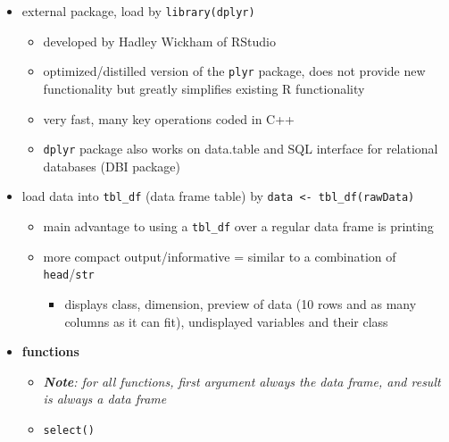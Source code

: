 \documentclass[
]{article}
\providecommand{\tightlist}{%
  \setlength{\itemsep}{0pt}\setlength{\parskip}{0pt}}
\begin{document}
\begin{itemize}
\tightlist
\item
  external package, load by \texttt{library(dplyr)}

  \begin{itemize}
  \tightlist
  \item
    developed by Hadley Wickham of RStudio
  \item
    optimized/distilled version of the \texttt{plyr} package, does not
    provide new functionality but greatly simplifies existing R
    functionality
  \item
    very fast, many key operations coded in C++
  \item
    \texttt{dplyr} package also works on data.table and SQL interface
    for relational databases (DBI package)
  \end{itemize}
\item
  load data into \texttt{tbl\_df} (data frame table) by
  \texttt{data\ \textless{}-\ tbl\_df(rawData)}

  \begin{itemize}
  \tightlist
  \item
    main advantage to using a \texttt{tbl\_df} over a regular data frame
    is printing
  \item
    more compact output/informative = similar to a combination of
    \texttt{head}/\texttt{str}

    \begin{itemize}
    \tightlist
    \item
      displays class, dimension, preview of data (10 rows and as many
      columns as it can fit), undisplayed variables and their class
    \end{itemize}
  \end{itemize}
\item
  \textbf{functions}

  \begin{itemize}
  \tightlist
  \item
    \emph{\textbf{Note}: for all functions, first argument always the
    data frame, and result is always a data frame }
  \item
    \texttt{select()}


\end{itemize}
\end{itemize}
\end{document}
